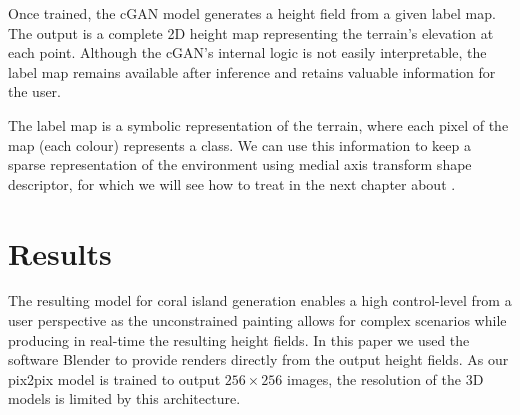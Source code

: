 
Once trained, the cGAN model generates a height field from a given label map. The output is a complete 2D height map representing the terrain's elevation at each point. Although the cGAN's internal logic is not easily interpretable, the label map remains available after inference and retains valuable information for the user.



The label map is a symbolic representation of the terrain, where each pixel of the map (each colour) represents a class. We can use this information to keep a sparse representation of the environment using medial axis transform shape descriptor, for which we will see how to treat in the next chapter about .


\section{Results}
\label{sec:coral-island-results}

The resulting model for coral island generation enables a high control-level from a user perspective as the unconstrained painting allows for complex scenarios while producing in real-time the resulting height fields. In this paper we used the software Blender to provide renders directly from the output height fields. As our pix2pix model is trained to output $256\times256$ images, the resolution of the 3D models is limited by this architecture.


